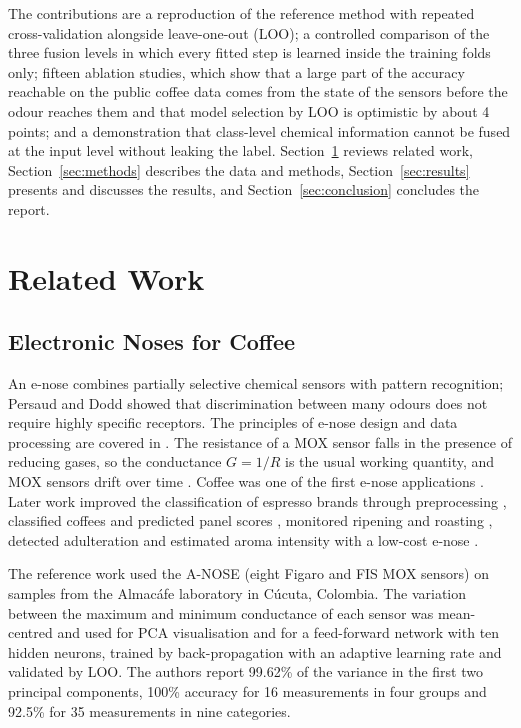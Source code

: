 The contributions are a reproduction of the reference method with repeated cross-validation alongside leave-one-out (LOO); a controlled comparison of the three fusion levels in which every fitted step is learned inside the training folds only; fifteen ablation studies, which show that a large part of the accuracy reachable on the public coffee data comes from the state of the sensors before the odour reaches them and that model selection by LOO is optimistic by about 4 points; and a demonstration that class-level chemical information cannot be fused at the input level without leaking the label. Section~\ref{sec:related} reviews related work, Section~\ref{sec:methods} describes the data and methods, Section~\ref{sec:results} presents and discusses the results, and Section~\ref{sec:conclusion} concludes the report.
\clearpage

\section{Related Work}
\label{sec:related}

\subsection{Electronic Noses for Coffee}

An e-nose combines partially selective chemical sensors with pattern recognition; Persaud and Dodd \cite{persaud1982analysis} showed that discrimination between many odours does not require highly specific receptors. The principles of e-nose design and data processing are covered in \cite{gardner1999electronic,marco2012signal}. The resistance of a MOX sensor falls in the presence of reducing gases, so the conductance $G = 1/R$ is the usual working quantity, and MOX sensors drift over time \cite{vergara2012chemical}. Coffee was one of the first e-nose applications \cite{gardner1992application}. Later work improved the classification of espresso brands through preprocessing \cite{pardo2000data}, classified coffees and predicted panel scores \cite{pardo2002coffee}, monitored ripening and roasting \cite{falasconi2005novel,romani2012evaluation}, detected adulteration \cite{brudzewski2012recognition} and estimated aroma intensity with a low-cost e-nose \cite{gonzalezviejo2021integrating}.

The reference work \cite{rodriguez2010electronic} used the A-NOSE (eight Figaro and FIS MOX sensors) on samples from the Almac\'{a}fe laboratory in C\'{u}cuta, Colombia. The variation between the maximum and minimum conductance of each sensor was mean-centred and used for PCA visualisation and for a feed-forward network with ten hidden neurons, trained by back-propagation with an adaptive learning rate and validated by LOO. The authors report 99.62\% of the variance in the first two principal components, 100\% accuracy for 16 measurements in four groups and 92.5\% for 35 measurements in nine categories.

